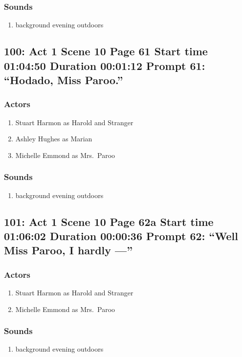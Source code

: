 \subsubsection{Sounds}
\begin{enumerate}
\item background evening outdoors
\end{enumerate}
\subsection{100: Act 1 Scene 10 Page 61 Start time 01:04:50 Duration 00:01:12 Prompt 61: ``Hodado, Miss Paroo.''}

\subsubsection{Actors}
\begin{enumerate}
\item Stuart Harmon as Harold and Stranger
\item Ashley Hughes as Marian
\item Michelle Emmond as Mrs.~Paroo
\end{enumerate}

\subsubsection{Sounds}
\begin{enumerate}
\item background evening outdoors
\end{enumerate}
\subsection{101: Act 1 Scene 10 Page 62a Start time 01:06:02 Duration 00:00:36 Prompt 62: ``Well Miss Paroo, I hardly ---''}

\subsubsection{Actors}
\begin{enumerate}
\item Stuart Harmon as Harold and Stranger
\item Michelle Emmond as Mrs.~Paroo
\end{enumerate}

\subsubsection{Sounds}
\begin{enumerate}
\item background evening outdoors
\end{enumerate}
